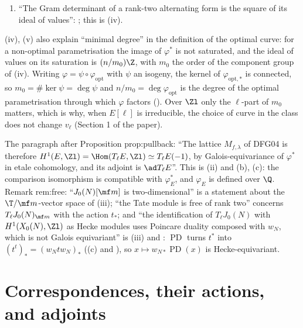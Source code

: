 \begin{paperlink}
\begin{enumerate}[label=(\alph*)]
\item ``The Gram determinant of a rank-two alternating form is the square of its ideal of values'': ; this is (iv).
\end{enumerate}
(iv), (v) also explain ``minimal degree'' in the definition of the optimal curve: for a non-optimal parametrisation the image of $\varphi^*$ is not saturated, and the
ideal of values on its saturation is $(n/m_0)\Z$, with $m_0$ the order of the component group of (iv). Writing $\varphi=\psi\circ\varphi_{\mathrm{opt}}$ with $\psi$ an isogeny, the kernel of $\varphi_{\mathrm{opt},*}$
is connected, so $m_0=\#\ker\psi=\deg\psi$ and $n/m_0=\deg\varphi_{\mathrm{opt}}$ is the degree of the optimal parametrisation through which $\varphi$ factors (). Over $\Zl$ only the $\ell$-part of $m_0$ matters, which is why,
when $E[\ell]$ is irreducible, the choice of curve in the class does not change $v_\ell$ (Section 1 of the paper).
\end{paperlink}

\begin{paperlink}\label{pl:curves:free}
The paragraph after Proposition prop:pullback: ``The lattice $M_{f,\lambda}$ of DFG04 is therefore $H^1(E,\Zl)=\Hom(T_\ell E,\Zl)\simeq T_\ell E(-1)$, by Galois-equivariance of $\varphi^*$ in etale
cohomology, and its adjoint is $\ad T_\ell E$''. This is (ii) and (b), (c): the comparison isomorphism is compatible with
$\varphi_E^*$, and $\varphi_E$ is defined over $\Q$. Remark rem:free: ``$J_0(N)[\mf m]$ is two-dimensional'' is a statement about the $\T/\mf m$-vector space of
(iii); ``the Tate module is free of rank two'' concerns $T_\ell J_0(N)_{\mf m}$ with the action $t_*$; and ``the identification of $T_\ell J_0(N)$ with $H^1(X_0(N),\Zl)$ as Hecke
modules uses Poincare duality composed with $w_N$, which is not Galois equivariant'' is (iii) and : $\operatorname{PD}$ turns $t^*$ into
$(t^t)_*=(w_Ntw_N)_*$ ((c) and ), so $x\mapsto w_{N*}\operatorname{PD}(x)$ is Hecke-equivariant.
\end{paperlink}

\section{Correspondences, their actions, and adjoints}\label{sec:curves:correspondences}

